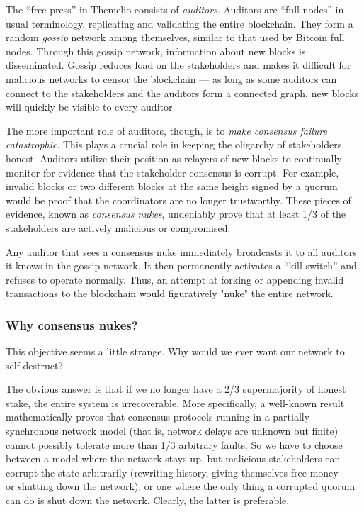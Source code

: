\documentclass[headinclude]{scrbook}
\begin{document}
The ``free press'' in Themelio consists of \emph{auditors}. Auditors are ``full nodes'' in usual terminology, replicating and validating the entire blockchain. They form a random \emph{gossip} network among themselves, similar to that used by Bitcoin full nodes. Through this gossip network, information about new blocks is disseminated. Gossip reduces load on the stakeholders and makes it difficult for malicious networks to censor the blockchain --- as long as some auditors can connect to the stakeholders and the auditors form a connected graph, new blocks will quickly be visible to every auditor.

The more important role of auditors, though, is to \textit{make consensus failure catastrophic}. This plays a crucial role in keeping the oligarchy of stakeholders honest. Auditors utilize their position as relayers of new blocks to continually monitor for evidence that the stakeholder consensus is corrupt. For example, invalid blocks or two different blocks at the same height signed by a quorum would be proof that the coordinators are no longer trustworthy. These pieces of evidence, known as \textit{consensus nukes}, undeniably prove that at least 1/3 of the stakeholders are actively malicious or compromised.

Any auditor that sees a consensus nuke immediately broadcasts it to all auditors it knows in the gossip network. It then permanently activates a ``kill switch'' and refuses to operate normally. Thus, an attempt at forking or appending invalid transactions to the blockchain would figuratively "nuke" the entire network.

\subsubsection{Why consensus nukes?}

This objective seems a little strange. Why would we ever want our network to self-destruct?

The obvious answer is that if we no longer have a 2/3 supermajority of honest stake, the entire system is irrecoverable. More specifically, a well-known result \cite{dwork1988consensus} mathematically proves that consensus protocols running in a partially synchronous network model (that is, network delays are unknown but finite) cannot possibly tolerate more than 1/3 arbitrary faults. So we have to choose between a model where the network stays up, but malicious stakeholders can corrupt the state arbitrarily (rewriting history, giving themselves free money --- or shutting down the network), or one where the only thing a corrupted quorum can do is shut down the network. Clearly, the latter is preferable.
\end{document}
